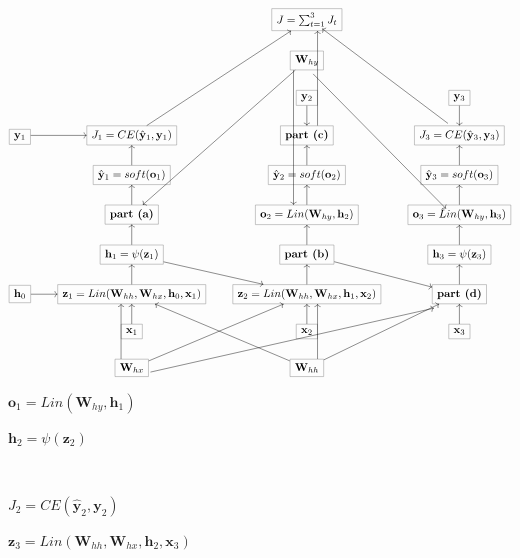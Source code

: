 \documentclass[11pt,addpoints,answers]{exam}
\newcommand{\hv}{\mathbf{h}}
\newcommand{\ov}{\mathbf{o}}
\newcommand{\xv}{\mathbf{x}}
\newcommand{\yv}{\mathbf{y}}
\newcommand{\zv}{\mathbf{z}}
\newcommand{\Wv}{\mathbf{W}}
\begin{document}
\begin{questions}
\begin{parts}
\begin{subparts}
    \begin{center}
    \[\begin{tikzcd}[cells={nodes={draw=gray}}]
	&& {J = \sum_{t=1}^3 J_t} \\
	&& {\Wv_{hy}} \\
	&& {\yv_2} & {\yv_3} \\
	{\yv_1} & {J_1 = CE(\hat{\yv}_{1}, \yv_1)} & {\textbf{part (c)}} & {J_3 = CE(\hat{\yv}_{3}, \yv_3)} \\
	& {\hat{\yv}_1 = soft(\ov_1)} & {\hat{\yv}_2 = soft(\ov_2)} & {\hat{\yv}_3 = soft(\ov_3)} \\
	& {\textbf{part (a)}} & {\ov_2 = Lin(\Wv_{hy}, \hv_2)} & {\ov_3 = Lin(\Wv_{hy}, \hv_3)} \\
	& {\hv_1 = \psi(\zv_1)} & {\textbf{part (b)}} & {\hv_3 = \psi(\zv_3)} \\
	{\hv_0} & {\zv_1 = Lin(\Wv_{hh}, \Wv_{hx},\hv_0,\xv_1)} & {\zv_2 = Lin(\Wv_{hh}, \Wv_{hx},\hv_1,\xv_2)} & {\textbf{part (d)}} \\
	& {\xv_1} & {\xv_2} & {\xv_3} \\
	& {\Wv_{hx}} & {\Wv_{hh}}
	\arrow[from=8-1, to=8-2]
	\arrow[from=9-2, to=8-2]
	\arrow[from=8-2, to=7-2]
	\arrow[from=7-2, to=8-3]
	\arrow[from=7-2, to=6-2]
	\arrow[from=6-2, to=5-2]
	\arrow[from=5-2, to=4-2]
	\arrow[from=4-1, to=4-2]
	\arrow[from=9-3, to=8-3]
	\arrow[from=8-3, to=7-3]
	\arrow[from=7-3, to=6-3]
	\arrow[from=6-3, to=5-3]
	\arrow[from=5-3, to=4-3]
	\arrow[from=3-3, to=4-3]
	\arrow[from=3-4, to=4-4]
	\arrow[from=5-4, to=4-4]
	\arrow[from=6-4, to=5-4]
	\arrow[from=7-4, to=6-4]
	\arrow[from=8-4, to=7-4]
	\arrow[from=7-3, to=8-4]
	\arrow[from=9-4, to=8-4]
	\arrow[shift left=4, from=10-2, to=8-2]
	\arrow[from=10-2, to=8-3]
	\arrow[from=10-3, to=8-2]
	\arrow[shift right=4, from=10-3, to=8-3]
	\arrow[from=10-3, to=8-4]
	\arrow[shift right=2, from=2-3, to=6-4]
	\arrow[from=2-3, to=6-2]
	\arrow[shift right=5, from=2-3, to=6-3]
	\arrow[from=4-2, to=1-3]
	\arrow[shift right=4, from=4-3, to=1-3]
	\arrow[shift right, from=4-4, to=1-3]
	\arrow[shift right=3, from=10-2, to=8-4]
\end{tikzcd}\]
\end{center}
    \begin{your_solution}[title=(a),height=2cm,width=6cm]
     ${\ov_1 = Lin(\Wv_{hy}, \hv_1)}$
    \end{your_solution}
     \begin{your_solution}[title=(b),height=2cm,width=6cm]
     ${\hv_2 = \psi(\zv_2)}$
    \end{your_solution}\\
     \begin{your_solution}[title=(c),height=2cm,width=6cm]
    ${J_2 = CE(\hat{\yv}_{2}, \yv_2)}$
    \end{your_solution}
     \begin{your_solution}[title=(d),height=2cm,width=6cm]
    ${\zv_3 = Lin(\Wv_{hh}, \Wv_{hx},\hv_2,\xv_3)}$
    \end{your_solution}


\end{subparts}
\end{parts}
\end{questions}
\end{document}
